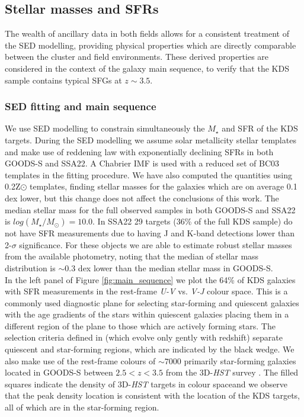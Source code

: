 \documentclass[fleqn,usenatbib]{mn2e}
\begin{document}
\subsection{Stellar masses and SFRs}\label{subsec:stellar_masses_and_sfrs}
The wealth of ancillary data in both fields allows for a consistent treatment of the SED modelling, providing physical properties which are directly comparable between the cluster and field environments.
These derived properties are considered in the context of the galaxy main sequence, to verify that the KDS sample contains typical SFGs at $z\sim3.5$.   

\subsubsection{SED fitting and main sequence}\label{subsubsec:sed_fitting}
We use SED modelling to constrain simultaneously the $M_{\star}$ and SFR of the KDS targets.
During the SED modelling we assume solar metallicity stellar templates and make use of \cite{Calzetti2000} reddening law with exponentially declining SFRs in both GOODS-S and SSA22.
A Chabrier IMF is used with a reduced set of BC03 \citep{Bruzual2003} templates in the fitting procedure.
We have also computed the quantities using 0.2Z$\odot$ templates, finding stellar masses for the galaxies which are on average 0.1 dex lower, but this change does not affect the conclusions of this work.
The median stellar mass for the full observed samples in both GOODS-S and SSA22 is $log(M_{\star}/M_{\odot}) = 10.0$.
In SSA22 29 targets (36\% of the full KDS sample) do not have SFR measurements due to having J and K-band detections lower than 2-$\sigma$ significance.
For these objects we are able to estimate robust stellar masses from the available photometry, noting that the median of stellar mass distribution is $\sim 0.3$ dex lower than the median stellar mass in GOODS-S. \\

In the left panel of Figure \ref{fig:main_sequence} we plot the 64\% of KDS galaxies with SFR measurements in the rest-frame {\it U-V} vs. {\it V-J} colour space.
This is a commonly used diagnostic plane for selecting star-forming and quiescent galaxies \citep[e.g.][]{Williams2009,Brammer2011,Whitaker2012a} with the age gradients of the stars within quiescent galaxies placing them in a different region of the plane to those which are actively forming stars.
The selection criteria defined in \cite{Whitaker2012a} (which evolve only gently with redshift) separate quiescent and star-forming regions, which are indicated by the black wedge.
We also make use of the rest-frame colours of $\sim7000$ primarily star-forming galaxies located in GOODS-S between $2.5 < z < 3.5$ from the 3D-{\em HST} survey \citep{Momcheva2016}.
The filled squares indicate the density of 3D-{\em HST} targets in colour spaceand we observe that the peak density location is consistent with the location of the KDS targets, all of which are in the star-forming region. 
\end{document}
